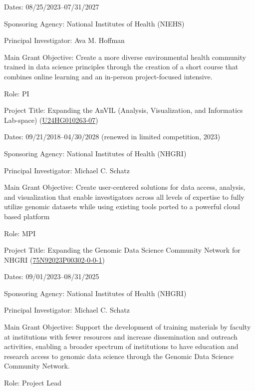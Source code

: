 \documentclass{cv}
\begin{document}
Dates: 08/25/2023--07/31/2027

Sponsoring Agency: National Institutes of Health (NIEHS)

Principal Investigator: Ava M. Hoffman

Main Grant Objective: Create a more diverse environmental health community trained in data science principles through the creation of a short course that combines online learning and an in-person project-focused intensive.

Role: PI

\vspace{5mm}

Project Title: Expanding the AnVIL (Analysis, Visualization, and Informatics Lab-space) (\href{https://reporter.nih.gov/search/n8pPuYzcskWEltb40MVBkA/project-details/10748042}{U24HG010263-07})

Dates: 09/21/2018--04/30/2028 (renewed in limited competition, 2023)

Sponsoring Agency: National Institutes of Health (NHGRI)

Principal Investigator: Michael C. Schatz

Main Grant Objective: Create user-centered solutions for data access, analysis, and visualization that enable investigators across all levels of expertise to fully utilize genomic datasets while using existing tools ported to a powerful cloud based platform

Role: MPI

\vspace{5mm}

Project Title: Expanding the Genomic Data Science Community Network for NHGRI (\href{https://reporter.nih.gov/search/hBYvgxL2yUO5iw9lGMoYTA/project-details/10944109}{75N92023P00302-0-0-1})

Dates: 09/01/2023--08/31/2025

Sponsoring Agency: National Institutes of Health (NHGRI)

Principal Investigator: Michael C. Schatz

Main Grant Objective: Support the development of training materials by faculty at institutions with fewer resources and increase dissemination and outreach activities, enabling a broader spectrum of institutions to have education and research access to genomic data science through the Genomic Data Science Community Network.

Role: Project Lead

%
%
%
%
%
%
\end{document}
